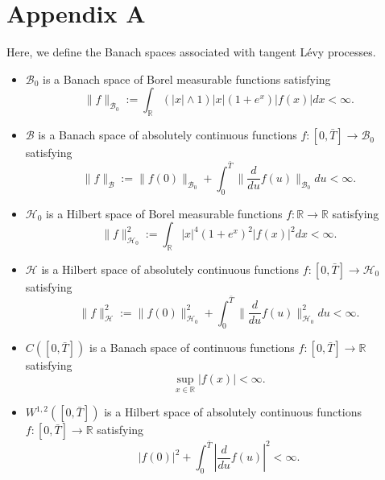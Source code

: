 \documentclass{article}
\numberwithin{equation}{section}
\newcommand\RR {\mathbb R}
\begin{document}
\section{Appendix A}\label{se:spaces}
Here, we define the Banach spaces associated with tangent L\'{e}vy processes. 
\begin{itemize}
\item $\mathcal{B}_0$ is a Banach space of Borel measurable functions satisfying
\begin{equation}\label{fo:review:B0}
\|f\|_{\mathcal{B}_0} := \int_\mathbb{R}(|x| \wedge 1)|x|(1+e^x)|f(x)|dx < \infty.
\end{equation}

\item $\mathcal{B}$ is a Banach space of absolutely continuous functions $f: [0, \bar{T}] \rightarrow \mathcal{B}_0$ satisfying
\begin{equation}\label{fo:review:B}
\|f\|_\mathcal{B} := \|f(0)\|_{\mathcal{B}_0} + \int_0^{\bar{T}} \| \frac{d}{du} f(u) \|_{\mathcal{B}_0} du < \infty.
\end{equation}

\item $\mathcal{H}_0$ is a Hilbert space of Borel measurable functions $f: \mathbb{R} \rightarrow \mathbb{R}$ satisfying
\begin{equation}
\|f\|^2_{\mathcal{H}_0} := \int_\mathbb{R}|x|^4(1+e^x)^2|f(x)|^2dx < \infty.
\end{equation}

\item $\mathcal{H}$ is a Hilbert space of absolutely continuous functions $f: [0, \bar{T}] \rightarrow \mathcal{H}_0$ satisfying
\begin{equation}\label{fo:review:H}
\|f\|^2_\mathcal{H} := \|f(0)\|^2_{\mathcal{H}_0} + \int_0^{\bar{T}} \| \frac{d}{du} f(u) \|^2_{\mathcal{H}_0} du < \infty.
\end{equation}

\item $C([0,\bar{T}])$ is a Banach space of continuous functions $f: [0,\bar{T}] \rightarrow \RR$ satisfying
\begin{equation}\label{fo:review:CoT}
\sup_{x\in \RR} |f(x)| < \infty.
\end{equation}

\item $W^{1,2}([0,\bar{T}])$ is a Hilbert space of absolutely continuous functions $f: [0, \bar{T}] \rightarrow \RR$ satisfying
\begin{equation}\label{fo:review:W12}
|f(0)|^2 + \int_0^{\bar{T}} | \frac{d}{du} f(u) |^2 < \infty.
\end{equation}


\end{itemize}
\end{document}
